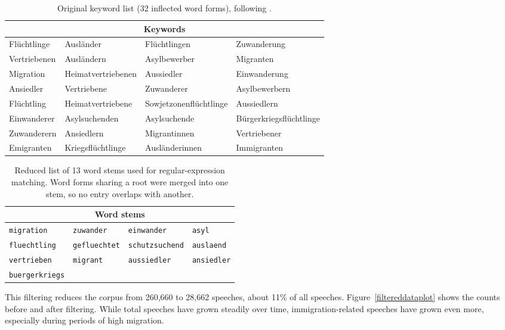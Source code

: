 \documentclass[12pt]{scrartcl}
\numberwithin{equation}{section}				%
\begin{document}
    \begin{table}[htbp]
    	\centering
    	\caption{Original keyword list (32 inflected word forms), following \textcite{kostikova2024fine}.}
    	\label{tab:keywords-original}
    	\footnotesize
    	\begin{tabular}{llll}
    		\toprule
    		\multicolumn{4}{c}{Keywords} \\
    		\midrule
    		Flüchtlinge & Ausländer & Flüchtlingen & Zuwanderung \\
    		Vertriebenen & Ausländern & Asylbewerber & Migranten \\
    		Migration & Heimatvertriebenen & Aussiedler & Einwanderung \\
    		Ansiedler & Vertriebene & Zuwanderer & Asylbewerbern \\
    		Flüchtling & Heimatvertriebene & Sowjetzonenflüchtlinge & Aussiedlern \\
    		Einwanderer & Asylsuchenden & Asylsuchende & Bürgerkriegsflüchtlinge \\
    		Zuwanderern & Ansiedlern & Migrantinnen & Vertriebener \\
    		Emigranten & Kriegsflüchtlinge & Ausländerinnen & Immigranten \\
    		\bottomrule
    	\end{tabular}
    \end{table}
    
    \begin{table}[htbp]
    	\centering
    	\caption{Reduced list of 13 word stems used for regular-expression matching. Word forms sharing a root were merged into one stem, so no entry overlaps with another.}
    	\label{tab:keywords-stems}
    	\footnotesize
    	\begin{tabular}{llll}
    		\toprule
    		\multicolumn{4}{c}{Word stems} \\
    		\midrule
    		\texttt{migration} & \texttt{zuwander} & \texttt{einwander} & \texttt{asyl} \\
    		\texttt{fluechtling} & \texttt{gefluechtet} & \texttt{schutzsuchend} & \texttt{auslaend} \\
    		\texttt{vertrieben} & \texttt{migrant} & \texttt{aussiedler} & \texttt{ansiedler} \\
    		\texttt{buergerkriegs} & & & \\
    		\bottomrule
    	\end{tabular}
    \end{table}
    
    This filtering reduces the corpus from 260,660 to 28,662 speeches, about 11\% of all speeches. Figure~\ref{filtereddataplot} shows the counts before and after filtering. While total speeches have grown steadily over time, immigration-related speeches have grown even more, especially during periods of high migration.
    
\end{document}
